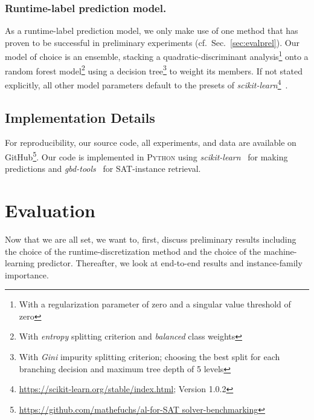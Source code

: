 \documentclass[runningheads]{llncs}
\begin{document}
\subsubsection{Runtime-label prediction model.}
As a runtime-label prediction model, we only make use of one method that has proven to be successful in preliminary experiments (cf.~Sec.~\ref{sec:evalprel}).
Our model of choice is an ensemble, stacking a quadratic-discriminant analysis\footnote{With a regularization parameter of zero and a singular value threshold of zero} onto a random forest model\footnote{With \emph{entropy} splitting criterion and \emph{balanced} class weights} using a decision tree\footnote{With \emph{Gini} impurity splitting criterion; choosing the best split for each branching decision and maximum tree depth of 5 levels} to weight its members.
If not stated explicitly, all other model parameters default to the presets of \emph{scikit-learn}\footnote{\url{https://scikit-learn.org/stable/index.html}; Version 1.0.2}~\cite{scikit-learn}.


\subsection{Implementation Details}
For reproducibility, our source code, all experiments, and data are available on GitHub\footnote{\url{https://github.com/mathefuchs/al-for-SAT solver-benchmarking}}.
Our code is implemented in \textsc{Python} using \emph{scikit-learn}~\cite{scikit-learn} for making predictions and \emph{gbd-tools}~\cite{IserS18} for SAT-instance retrieval.


\section{Evaluation}
\label{sec:eval}
Now that we are all set, we want to, first, discuss preliminary results including the choice of the runtime-discretization method and the choice of the machine-learning predictor.
Thereafter, we look at end-to-end results and instance-family importance.
\end{document}
